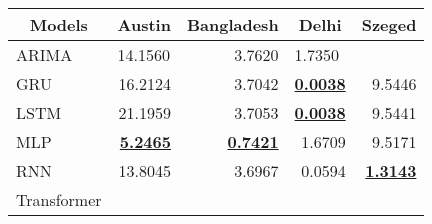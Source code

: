 \begin{table}[!ht]
\centering
\begin{tabular}{|l|r|r|r|r|}
\hline
\multicolumn{1}{|c|}{Models} & \multicolumn{1}{c|}{Austin}  & \multicolumn{1}{c|}{Bangladesh} & \multicolumn{1}{c|}{Delhi}  & \multicolumn{1}{c|}{Szeged} \\ \hline
ARIMA                        & \multicolumn{1}{l|}{14.1560} & 3.7620                          & \multicolumn{1}{l|}{1.7350} & \multicolumn{1}{l|}{}       \\ \hline
GRU                          & 16.2124                      & 3.7042                          & {\ul \textbf{0.0038}}       & 9.5446                      \\ \hline
LSTM                         & 21.1959                      & 3.7053                          & {\ul \textbf{0.0038}}       & 9.5441                      \\ \hline
MLP                          & {\ul \textbf{5.2465}}        & {\ul \textbf{0.7421}}           & 1.6709                      & 9.5171                      \\ \hline
RNN                          & 13.8045                      & 3.6967                          & 0.0594                      & {\ul \textbf{1.3143}}       \\ \hline
Transformer                  &                              &                                 &                             &                             \\ \hline
\end{tabular}
\end{table}
